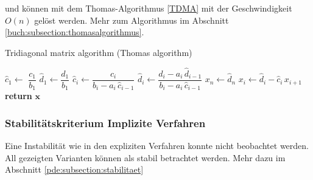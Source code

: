	   und k\"onnen mit dem Thomas-Algorithmus \autoref{TDMA} \cite{burgers:thomas} mit der Geschwindigkeit $O(n)$ gel\"ost werden.
%
	   Mehr zum Algorithmus im Abschnitt \ref{buch:subsection:thomasalgorithmus}.

	\begin{algorithm}\caption{Tridiagonal matrix algorithm (Thomas algorithm)}\label{TDMA}
	  \setlength{\lineskip}{7pt}
	  \begin{algorithmic}[1]
	      \State $\hat c_1 \gets$ $ \dfrac{c_1}{b_1}$
	      \State $\hat d_1 \gets \dfrac{d_1}{b_1}$
	        \State $\hat c_i \gets \dfrac{c_i}{b_i-a_i \, \hat c_{i-1}}$
	      \EndFor
	        \State $\hat d_i \gets \dfrac{d_i - a_i \, \hat d_{i-1}}{b_i-a_i \, \hat c_{i-1}}$
	      \EndFor
	      \State $x_n \gets \hat d_n$
	        \State $x_i \gets \hat d_i - \hat c_i \, x_{i+1}$
	      \EndFor
	      \State \textbf{return} $\textbf{x}$
	    \EndFunction
	  \end{algorithmic}
	\end{algorithm}

	\subsubsection{Stabilit\"atskriterium Implizite Verfahren}

	Eine Instabilit\"at wie in den expliziten Verfahren konnte nicht beobachtet werden.
	All gezeigten Varianten k\"onnen als stabil betrachtet werden.
	Mehr dazu im Abschnitt \ref{pde:subsection:stabilitaet}
